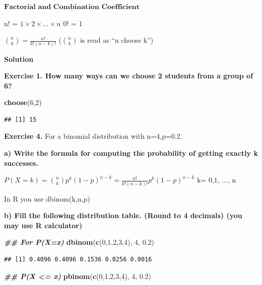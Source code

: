 \documentclass[
]{book}
\newenvironment{Shaded}{\begin{snugshade}}{\end{snugshade}}
\newcommand{\DecValTok}[1]{\textcolor[rgb]{0.00,0.00,0.81}{#1}}
\newcommand{\DocumentationTok}[1]{\textcolor[rgb]{0.56,0.35,0.01}{\textbf{\textit{#1}}}}
\newcommand{\FloatTok}[1]{\textcolor[rgb]{0.00,0.00,0.81}{#1}}
\newcommand{\FunctionTok}[1]{\textcolor[rgb]{0.13,0.29,0.53}{\textbf{#1}}}
\newcommand{\NormalTok}[1]{#1}
\begin{document}
\(\underline{\textbf{Factorial and Combination Coefficient}}\)

n! = \(1 \times 2 \times ... \times n\) 0! = 1

\(\binom nk = \frac{n!}{k!(n-k)!}\) (\(\binom nk\) is read as ``n choose k'')

\textbf{Solution}

\textbf{Exercise 1. How many ways can we choose 2 students from a group of 6?}

\begin{Shaded}
\begin{Highlighting}[]
\FunctionTok{choose}\NormalTok{(}\DecValTok{6}\NormalTok{,}\DecValTok{2}\NormalTok{)}
\end{Highlighting}
\end{Shaded}

\begin{verbatim}
## [1] 15
\end{verbatim}

\textbf{Exercise 4.} For a binomial distribution with n=4,p=0.2.

\textbf{a) Write the formula for computing the probability of getting exactly k successes.}

\(P(X =k) = \binom nkp^k(1-p)^{n-k}=\frac{n!}{k! (n-k)!}p^k(1-p)^{n-k} \text{  k= 0,1, ..., n}\)

In R you use dbinom(k,n,p)

\textbf{b) Fill the following distribution table. (Round to 4 decimals) (you may use R calculator)}

\begin{Shaded}
\begin{Highlighting}[]
\DocumentationTok{\#\# For P(X=x)}
\FunctionTok{dbinom}\NormalTok{(}\FunctionTok{c}\NormalTok{(}\DecValTok{0}\NormalTok{,}\DecValTok{1}\NormalTok{,}\DecValTok{2}\NormalTok{,}\DecValTok{3}\NormalTok{,}\DecValTok{4}\NormalTok{), }\DecValTok{4}\NormalTok{, }\FloatTok{0.2}\NormalTok{)}
\end{Highlighting}
\end{Shaded}

\begin{verbatim}
## [1] 0.4096 0.4096 0.1536 0.0256 0.0016
\end{verbatim}

\begin{Shaded}
\begin{Highlighting}[]
\DocumentationTok{\#\# P(X \textless{}= x)}
\FunctionTok{pbinom}\NormalTok{(}\FunctionTok{c}\NormalTok{(}\DecValTok{0}\NormalTok{,}\DecValTok{1}\NormalTok{,}\DecValTok{2}\NormalTok{,}\DecValTok{3}\NormalTok{,}\DecValTok{4}\NormalTok{), }\DecValTok{4}\NormalTok{, }\FloatTok{0.2}\NormalTok{)}
\end{Highlighting}
\end{Shaded}
\end{document}
